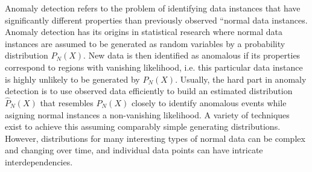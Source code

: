 \documentclass[a4paper,12pt,twoside]{article}
\begin{document}
Anomaly detection refers to the problem of identifying data instances that have significantly different properties than previously observed ``normal data instances. Anomaly detection has its origins in statistical research where normal data instances are assumed to be generated as random variables by a probability distribution $P_\textit{N}(X)$. New data is then identified as anomalous if its properties correspond to regions with vanishing likelihood, i.e. this particular data instance is highly unlikely to be generated by $P_\textit{N}(X)$. Usually, the hard part in anomaly detection is to use observed data efficiently to build an estimated distribution $\hat{P}_\textit{N}(X)$ that resembles $P_\textit{N}(X)$ closely to identify anomalous events while asigning normal instances a non-vanishing likelihood. A variety of techniques exist to achieve this assuming comparably simple generating distributions. However, distributions for many interesting types of normal data can be complex and changing over time, and individual data points can have intricate interdependencies. 
\end{document}
